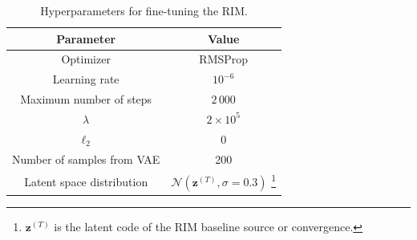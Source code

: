 \begin{table}[H]
        \centering
        \caption{Hyperparameters for fine-tuning the RIM.}
        \label{tab:fine-tuning hparams}
        \begin{tabular}{cc}
                Parameter & Value \\\hline\hline
                Optimizer & RMSProp \\
                Learning rate & $10^{-6}$\\
                Maximum number of steps & $2\,000$\\
                $\lambda$ & $2\times 10^{5}$\\
                $\ell_2$ & 0 \\
                Number of samples from VAE & 200 \\
                Latent space distribution & $\mathcal{N}(\mathbf{z}^{(T)}, \sigma=0.3)$
                \footnote{$\mathbf{z}^{(T)}$ is the latent code of the RIM baseline source or convergence.}\\
                \hline
        \end{tabular}
\end{table}
